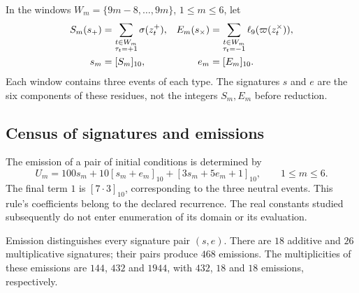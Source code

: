 In the windows $W_m=\{9m-8,\ldots,9m\}$, $1\le m\le6$, let
\begin{align}
 S_m(s_+)&=\sum_{\substack{t\in W_m\\\tau_t=+1}}
                 \sigma(z_t^+),&
 E_m(s_\times)&=\sum_{\substack{t\in W_m\\\tau_t=-1}}
                 \ell_9(\varpi(z_t^\times)),
 \label{iii:iii:nf-firmas}\\
 s_m&=[S_m]_{10},&e_m&=[E_m]_{10}.\notag
\end{align}
Each window contains three events of each type. The signatures $s$ and $e$
are the six components of these residues, not the integers $S_m,E_m$
before reduction.

\subsection{Census of signatures and emissions}

The emission of a pair of initial conditions is determined by
\begin{equation}
 U_m=100s_m+10[s_m+e_m]_{10}+[3s_m+5e_m+1]_{10},
 \qquad 1\le m\le6.
 \label{iii:iii:nf-emision}
\end{equation}
The final term $1$ is $[7\cdot3]_{10}$, corresponding to the three
neutral events. This rule's coefficients belong to the declared
recurrence. The real constants studied subsequently
do not enter enumeration of its domain or its evaluation.

\begin{proposition}
\label{iii:iii:nf-inyectividad}
Emission distinguishes every signature pair $(s,e)$. There are $18$ additive
and $26$ multiplicative signatures; their pairs produce $468$ emissions.
The multiplicities of these emissions are $144$, $432$ and $1944$,
with $432$, $18$ and $18$ emissions, respectively.
\end{proposition}

